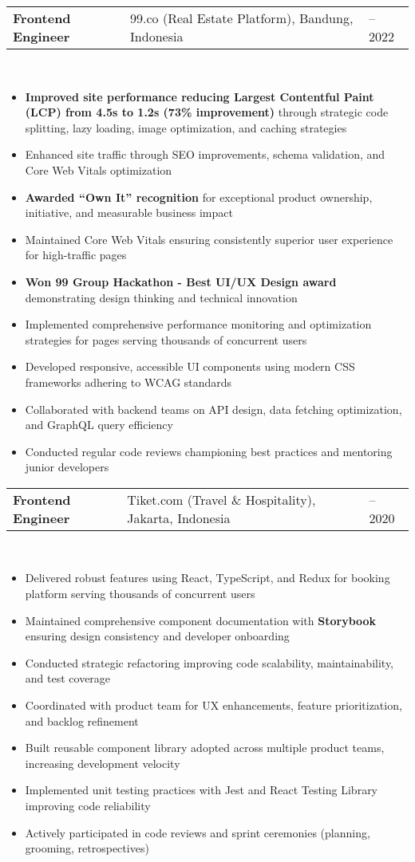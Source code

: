 \documentclass[a4paper, 11pt]{article}
\newcommand{\resumeItem}[1]{
  \item\small{
    {#1 \vspace{-2pt}}
  }
}
\newcommand{\resumeSubheading}[4]{
  \vspace{-2pt}\item
    \begin{tabularx}{0.987\textwidth}[t]{
  >{\raggedright\arraybackslash}X
  >{\centering\arraybackslash}X
  >{\raggedleft\arraybackslash}X }
      \textbf{#1} & #2 & #3 \\
    \end{tabularx}
    \textit{\small#4}\\
    \vspace{-7pt}
}
\newcommand{\resumeItemListStart}{\begin{itemize}[leftmargin=0.22in]}
\newcommand{\resumeItemListEnd}{\end{itemize}\vspace{-20pt}}
\begin{document}
        \resumeSubheading
            {Frontend Engineer}{99.co (Real Estate Platform), Bandung, Indonesia}{2020 -- 2022}{}
            \resumeItemListStart
                \resumeItem{\textbf{Improved site performance reducing Largest Contentful Paint (LCP) from 4.5s to 1.2s (73\% improvement)} through strategic code splitting, lazy loading, image optimization, and caching strategies}
                \resumeItem{Enhanced site traffic through SEO improvements, schema validation, and Core Web Vitals optimization}
                \resumeItem{\textbf{Awarded ``Own It'' recognition} for exceptional product ownership, initiative, and measurable business impact}
                \resumeItem{Maintained Core Web Vitals ensuring consistently superior user experience for high-traffic pages}
                \resumeItem{\textbf{Won 99 Group Hackathon - Best UI/UX Design award} demonstrating design thinking and technical innovation}
                \resumeItem{Implemented comprehensive performance monitoring and optimization strategies for pages serving thousands of concurrent users}
                \resumeItem{Developed responsive, accessible UI components using modern CSS frameworks adhering to WCAG standards}
                \resumeItem{Collaborated with backend teams on API design, data fetching optimization, and GraphQL query efficiency}
                \resumeItem{Conducted regular code reviews championing best practices and mentoring junior developers}
            \resumeItemListEnd

        \resumeSubheading
            {Frontend Engineer}{Tiket.com (Travel \& Hospitality), Jakarta, Indonesia}{2019 -- 2020}{}
            \resumeItemListStart
                \resumeItem{Delivered robust features using React, TypeScript, and Redux for booking platform serving thousands of concurrent users}
                \resumeItem{Maintained comprehensive component documentation with \textbf{Storybook} ensuring design consistency and developer onboarding}
                \resumeItem{Conducted strategic refactoring improving code scalability, maintainability, and test coverage}
                \resumeItem{Coordinated with product team for UX enhancements, feature prioritization, and backlog refinement}
                \resumeItem{Built reusable component library adopted across multiple product teams, increasing development velocity}
                \resumeItem{Implemented unit testing practices with Jest and React Testing Library improving code reliability}
                \resumeItem{Actively participated in code reviews and sprint ceremonies (planning, grooming, retrospectives)}
            \resumeItemListEnd
\end{document}
